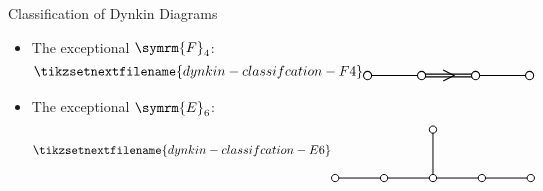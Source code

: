 \documentclass[fleqn]{NotesClass}
\newcommand{\dynkin}[2]{\symrm{#1}_{#2}}
\begin{document}
\begin{thm}{Classification of Dynkin Diagrams}{}
\begin{itemize}
\begin{equation*}
\begin{tikzpicture}[baseline=(current bounding box), scale=0.7]
                    \draw[thick] (0, 0) -- (2, 0);
                    \draw[thick, yshift=0.075cm] (0, 0) -- (2, 0);
                    \draw[thick, yshift=-0.075cm] (0, 0) -- (2, 0);
                    \draw[thick, fill=white] (0, 0) circle [radius=0.15];
                    \draw[thick, fill=white] (2, 0) circle [radius=0.15];
                    \draw[thick] (0.8, 0.2) -- (1.2, 0) -- (0.8, -0.2);
                \end{tikzpicture}
            \end{equation*}
            \item The exceptional \(\dynkin{F}{4}\):
            \begin{equation*}
                \tikzsetnextfilename{dynkin-classifcation-F4}
                \begin{tikzpicture}[baseline=(current bounding box), scale=0.7]
                    \draw[thick] (0, 0) -- (2, 0);
                    \draw[thick, yshift=0.05cm] (2, 0) -- (4, 0);
                    \draw[thick, yshift=-0.05cm] (2, 0) -- (4, 0);
                    \draw[thick] (4, 0) -- (6, 0);
                    \draw[thick, fill=white] (0, 0) circle [radius=0.15];
                    \draw[thick, fill=white] (2, 0) circle [radius=0.15];
                    \draw[thick, fill=white] (4, 0) circle [radius=0.15];
                    \draw[thick, fill=white] (6, 0) circle [radius=0.15];
                    \draw[thick] (2.8, 0.2) -- (3.2, 0) -- (2.8, -0.2);
                \end{tikzpicture}
            \end{equation*}
            \item The exceptional \(\dynkin{E}{6}\):
            \begin{equation*}
                \tikzsetnextfilename{dynkin-classifcation-E6}
                \begin{tikzpicture}[baseline=(current bounding box), scale=0.7]
                    \draw[thick] (0, 0) -- (8, 0);
                    \draw[thick] (4, 0) -- (4, 2);
                    \draw[thick, fill=white] (0, 0) circle [radius=0.15];
                    \draw[thick, fill=white] (2, 0) circle [radius=0.15];
                    \draw[thick, fill=white] (4, 0) circle [radius=0.15];
                    \draw[thick, fill=white] (6, 0) circle [radius=0.15];
                    \draw[thick, fill=white] (8, 0) circle [radius=0.15];
                    \draw[thick, fill=white] (4, 2) circle [radius=0.15];
                \end{tikzpicture}

\end{equation*}
\end{itemize}
\end{thm}
\end{document}
